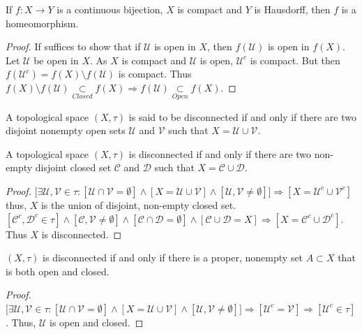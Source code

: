 \documentclass[crop=false,class=book,oneside]{standalone}
\begin{document}
            \begin{theorem}
            If $f:X\rightarrow Y$ is a continuous bijection, $X$ is compact and $Y$ is Hausdorff, then $f$ is a homeomorphism.
            \end{theorem}
            \begin{proof}
            If suffices to show that if $\mathcal{U}$ is open in $X$, then $f(\mathcal{U})$ is open in $f(X)$. Let $\mathcal{U}$ be open in $X$. As $X$ is compact and $\mathcal{U}$ is open, $\mathcal{U}^c$ is compact. But then $f(\mathcal{U}^c) = f(X)\setminus f(\mathcal{U})$ is compact. Thus $f(X)\setminus f(\mathcal{U})\underset{Closed}\subset f(X)\Rightarrow f(\mathcal{U})\underset{Open}\subset f(X)$.
            \end{proof}
            \begin{definition}
            A topological space $(X,\tau)$ is said to be disconnected if and only if there are two disjoint nonempty open sets $\mathcal{U}$ and $\mathcal{V}$ such that $X = \mathcal{U}\cup \mathcal{V}$.
            \end{definition}
            \begin{theorem}
            A topological space $(X,\tau)$ is disconnected if and only if there are two non-empty disjoint closed set $\mathcal{C}$ and $\mathcal{D}$ such that $X=\mathcal{C}\cup\mathcal{D}$.
            \end{theorem}
            \begin{proof}
            $\big[\exists \mathcal{U},\mathcal{V}\in \tau: [\mathcal{U}\cap \mathcal{V}=\emptyset]\land [X=\mathcal{U}\cup \mathcal{V}]\land [\mathcal{U},\mathcal{V}\ne \emptyset]\big]\Rightarrow [X = \mathcal{U}^c\cup \mathcal{V}^c]$ thus, $X$ is the union of disjoint, non-empty closed set. $[\mathcal{C}^c,\mathcal{D}^c\in \tau]\land[\mathcal{C},\mathcal{V}\ne\emptyset]\land[\mathcal{C}\cap \mathcal{D}=\emptyset]\land[\mathcal{C}\cup\mathcal{D}=X]\Rightarrow [X=\mathcal{C}^c\cup\mathcal{D}^c].$ Thus $X$ is disconnected.
            \end{proof}
            \begin{theorem}
            $(X,\tau)$ is disconnected if and only if there is a proper, nonempty set $A\subset X$ that is both open and closed.
            \end{theorem}
            \begin{proof}
            $\big[\exists \mathcal{U},\mathcal{V}\in \tau:[\mathcal{U}\cap \mathcal{V}=\emptyset]\land [X=\mathcal{U}\cup\mathcal{V}]\land[\mathcal{U},\mathcal{V}\ne \emptyset]\big]\Rightarrow [\mathcal{U}^c = \mathcal{V}]\Rightarrow [\mathcal{U}^c\in \tau]$. Thus, $\mathcal{U}$ is open and closed.
            \end{proof}
\end{document}
